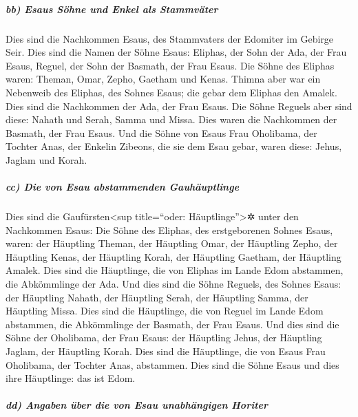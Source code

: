 \hypertarget{bb-esaus-suxf6hne-und-enkel-als-stammvuxe4ter}{%
\subparagraph{bb) Esaus Söhne und Enkel als
Stammväter}\label{bb-esaus-suxf6hne-und-enkel-als-stammvuxe4ter}}

 Dies sind die Nachkommen Esaus, des Stammvaters der
Edomiter im Gebirge Seir.  Dies sind die Namen der Söhne
Esaus: Eliphas, der Sohn der Ada, der Frau Esaus, Reguel, der Sohn der
Basmath, der Frau Esaus.  Die Söhne des Eliphas waren:
Theman, Omar, Zepho, Gaetham und Kenas.  Thimna aber war
ein Nebenweib des Eliphas, des Sohnes Esaus; die gebar dem Eliphas den
Amalek. Dies sind die Nachkommen der Ada, der Frau Esaus.
 Die Söhne Reguels aber sind diese: Nahath und Serah,
Samma und Missa. Dies waren die Nachkommen der Basmath, der Frau Esaus.
 Und die Söhne von Esaus Frau Oholibama, der Tochter
Anas, der Enkelin Zibeons, die sie dem Esau gebar, waren diese: Jehus,
Jaglam und Korah.

\hypertarget{cc-die-von-esau-abstammenden-gauhuxe4uptlinge}{%
\subparagraph{cc) Die von Esau abstammenden
Gauhäuptlinge}\label{cc-die-von-esau-abstammenden-gauhuxe4uptlinge}}

 Dies sind die Gaufürsten\textless sup title=``oder:
Häuptlinge''\textgreater✲ unter den Nachkommen Esaus: Die Söhne des
Eliphas, des erstgeborenen Sohnes Esaus, waren: der Häuptling Theman,
der Häuptling Omar, der Häuptling Zepho, der Häuptling Kenas,
 der Häuptling Korah, der Häuptling Gaetham, der
Häuptling Amalek. Dies sind die Häuptlinge, die von Eliphas im Lande
Edom abstammen, die Abkömmlinge der Ada.  Und dies sind
die Söhne Reguels, des Sohnes Esaus: der Häuptling Nahath, der Häuptling
Serah, der Häuptling Samma, der Häuptling Missa. Dies sind die
Häuptlinge, die von Reguel im Lande Edom abstammen, die Abkömmlinge der
Basmath, der Frau Esaus.  Und dies sind die Söhne der
Oholibama, der Frau Esaus: der Häuptling Jehus, der Häuptling Jaglam,
der Häuptling Korah. Dies sind die Häuptlinge, die von Esaus Frau
Oholibama, der Tochter Anas, abstammen.  Dies sind die
Söhne Esaus und dies ihre Häuptlinge: das ist Edom.

\hypertarget{dd-angaben-uxfcber-die-von-esau-unabhuxe4ngigen-horiter}{%
\subparagraph{dd) Angaben über die von Esau unabhängigen
Horiter}\label{dd-angaben-uxfcber-die-von-esau-unabhuxe4ngigen-horiter}}

